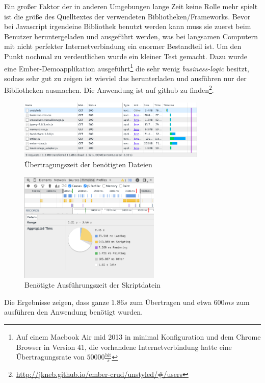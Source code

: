 \documentclass[12pt,twoside]{book}
\begin{document}
Ein großer Faktor der in anderen Umgebungen lange Zeit keine Rolle mehr spielt ist die größe des Quelltextes der verwendeten Bibliotheken/Frameworks. Bevor bei Javascript irgendeine Bibliothek benutzt werden kann muss sie zuerst beim Benutzer heruntergeladen und ausgeführt werden, was bei langsamen Computern mit nicht perfekter Internetverbindung ein enormer Bestandteil ist. Um den Punkt nochmal zu verdeutlichen wurde ein kleiner Test gemacht. Dazu wurde eine Ember-Demoapplikation ausgeführt\footnote{Auf einem Macbook Air mid 2013 in minimal Konfiguration und dem Chrome Browser in Version 41, die vorhandene Internetverbindung hatte eine Übertragungsrate von $50000 \frac{\text{bit}}{s}$} die sehr wenig \textit{business-logic} besitzt, sodass sehr gut zu zeigen ist wieviel das herunterladen und ausführen nur der Bibliotheken ausmachen.
Die Anwendung ist auf github zu finden\footnote{\url{http://jkneb.github.io/ember-crud/unstyled/\#/users}}.
\begin{figure}[H]
    \centering
    \includegraphics[width=0.8\textwidth]{images/performance_1.png}
    \caption{Übertragungszeit der benötigten Dateien}
    \label{fig:awesome_image}
\end{figure}
\begin{figure}[H]
    \centering
    \includegraphics[width=0.6\textwidth]{images/performance_2.png}
    \caption{Benötigte Ausführungszeit der Skriptdatein}
    \label{fig:awesome_image}
\end{figure}
Die Ergebnisse zeigen, dass ganze $1.86s$ zum Übertragen und etwa $600ms$ zum ausführen den Anwendung benötigt wurden.
\end{document}
